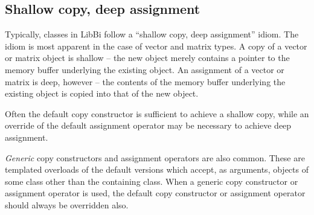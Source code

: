 \subsection{Shallow copy, deep assignment}

Typically, classes in LibBi follow a ``shallow copy, deep assignment''
idiom. The idiom is most apparent in the case of vector and matrix types. A
copy of a vector or matrix object is shallow -- the new object merely contains
a pointer to the memory buffer underlying the existing object. An assignment
of a vector or matrix is deep, however -- the contents of the memory buffer
underlying the existing object is copied into that of the new object.

Often the default copy constructor is sufficient to achieve a shallow copy,
while an override of the default assignment operator may be necessary to
achieve deep assignment.

\emph{Generic} copy constructors and assignment operators are also
common. These are templated overloads of the default versions which accept, as
arguments, objects of some class other than the containing class. When a
generic copy constructor or assignment operator is used, the default copy
constructor or assignment operator should always be overridden also.
